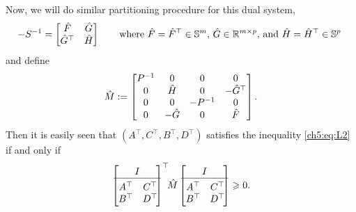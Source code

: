 Now, we will do similar partitioning procedure for this dual system,
$$
-S^{-1} = \begin{bmatrix}
\hat{F}&\hat{G}\\
\hat{G}^\top  &\hat{H}
\end{bmatrix}\qquad\text{where $\hat{F}=\hat{F}^\top \in\mathbb{S}^{m}$, $\hat{G}\in\mathbb{R}^{m\times p}$, and $\hat{H}=\hat{H}^\top \in\mathbb{S}^{p}$ }
$$
and define 
\begin{equation} \label{ch5:eq:Mhat}
\hat{M} := \begin{bmatrix}
    P\inv & 0 & 0 & 0 \\
    0 & \hatH & 0 &-\hatG^\top\\
    0 & 0 & -P\inv & 0 \\
    0 & -\hatG & 0 & \hatF
    \end{bmatrix}.
\end{equation}
Then it is easily seen that $(A^\top, C^\top,B^\top, D^\top)$ satisfies the inequality \eqref{ch5:eq:L2} if and only if 
\begin{equation}
\label{ch5:eq:M1}
\bbm
I\\\hline\\[-3mm]
\begin{matrix}
A^\top & C^\top\!\\
B^\top & D^\top\!
\end{matrix}
\ebm^\top\!\! \hat{M} \bbm
I\\\hline\\[-3mm]
\begin{matrix}
A^\top & C^\top\!\\
B^\top & D^\top\!
\end{matrix}
\ebm \geq 0.
\end{equation} 
 \label{ch5:t:noise 1}
